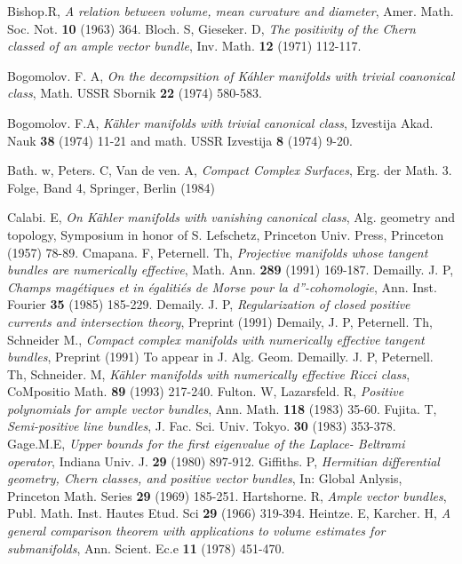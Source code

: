  
\begin{thebibliography}{99}
 Bishop.\pageoriginale R, \textit{A relation between volume, mean curvature and diameter}, Amer. Math. Soc. Not. {\bf 10} (1963) 364.
 Bloch. S, Gieseker. D, \textit{The positivity of the Chern classed of an ample vector bundle}, Inv. Math. {\bf 12} (1971) 112-117.

 Bogomolov. F. A, \textit{On the decompsition of K\'ahler manifolds with trivial coanonical class}, Math. USSR Sbornik {\bf 22} (1974) 580-583.

 Bogomolov. F.A, \textit{K\"ahler manifolds with trivial canonical class}, Izvestija Akad. Nauk {\bf 38} (1974) 11-21 and math. USSR Izvestija {\bf 8} (1974) 9-20.

 Bath. w, Peters. C, Van de ven. A, \textit{Compact Complex Surfaces}, Erg. der Math. 3. Folge, Band 4, Springer, Berlin (1984)

 Calabi. E, \textit{On K\"ahler manifolds with vanishing canonical class}, Alg. geometry and topology, Symposium in honor of S. Lefschetz, Princeton Univ. Press, Princeton (1957) 78-89.
 Cmapana. F, Peternell. Th, \textit{Projective manifolds whose tangent bundles are numerically effective}, Math. Ann.  {\bf  289} (1991) 169-187.
 Demailly. J. P, \textit{Champs mag\'etiques et in \'egaliti\'es de Morse pour la d''-cohomologie}, Ann. Inst. Fourier {\bf 35} (1985) 185-229.
 Demaily. J. P, \textit{Regularization of closed positive currents and intersection theory}, Preprint (1991) 
 Demaily, J. P, Peternell. Th, Schneider M., \textit{Compact complex manifolds with numerically effective tangent bundles}, Preprint (1991) To appear in J. Alg. Geom.
 Demailly. J. P, Peternell. Th, Schneider. M, \textit{K\"ahler manifolds with numerically effective Ricci class}, CoMpositio Math. {\bf 89} (1993) 217-240.
 Fulton. W, Lazarsfeld. R, \textit{Positive polynomials for ample vector bundles}, Ann. Math.
{\bf 118} (1983) 35-60.
 Fujita. T, \textit{Semi-positive line bundles}, J. Fac. Sci. Univ. Tokyo. {\bf 30} (1983) 353-378.
 Gage.\pageoriginale M.E, \textit{Upper bounds for the first eigenvalue of the Laplace- Beltrami operator}, Indiana Univ. J. {\bf 29} (1980) 897-912.
 Giffiths. P, \textit{Hermitian differential geometry, Chern classes, and positive vector 
bundles}, In: Global Anlysis, Princeton Math. Series {\bf 29} (1969) 185-251.
  Hartshorne. R, \textit{Ample vector bundles}, Publ. Math. Inst. Hautes Etud. Sci {\bf 29} (1966) 319-394.
  Heintze. E, Karcher. H, \textit{A general comparison theorem with applications to volume estimates for submanifolds}, Ann. Scient. Ec.e {\bf 11} (1978) 451-470.
 

\end{thebibliography}
